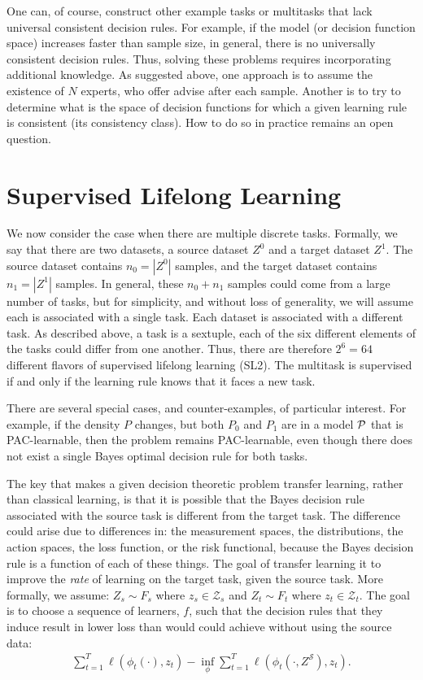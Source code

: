 \documentclass{article}
\begin{document}
One can, of course, construct other example tasks or multitasks that lack universal consistent decision rules.  For example, if the model (or decision function space) increases faster than sample size, in general, there is no universally consistent decision rules.  Thus, solving these problems requires incorporating additional knowledge.  As suggested above, one approach is to assume the existence of $N$ experts, who offer advise after each sample.  Another is to try to determine what is the space of decision functions for which a given learning rule is consistent (its consistency class).  How to do so in practice remains an open question.


\section{Supervised Lifelong Learning}
\label{sec:transfer}

We now consider the case when there are multiple discrete tasks.  Formally, we say that there are two datasets, a source dataset $Z^0$ and a target dataset $Z^1$. The source dataset contains $n_0 = | Z^0|$ samples, and the target dataset contains $n_1 = |Z^1|$ samples. In general, these $n_0+n_1$ samples could come from a large number of tasks, but for simplicity, and without loss of generality, we will assume each is associated with a single task.  Each dataset is associated with a different task.  As described above, a task is a sextuple, each of the six different elements of the tasks could differ from one another. Thus, there are therefore $2^6=64$ different flavors of supervised lifelong learning (SL2). The multitask is supervised if and only if the learning rule knows that it faces a new task.

There are several special cases, and counter-examples, of particular interest.  For example, if the density $P$ changes, but both $P_0$ and $P_1$ are in a model $\mathcal{P}$ that is PAC-learnable, then the problem remains PAC-learnable, even though there does not exist a single Bayes optimal decision rule for both tasks. 




The key that makes a given decision theoretic problem transfer learning, rather than classical learning, is that it is possible that the Bayes decision rule associated with the source task is different from the target task.  The difference could arise due to differences in: the measurement spaces, the distributions, the action spaces, the loss function, or the risk functional, because the Bayes decision rule is a function of each of these things.  The goal of transfer learning it to improve the \emph{rate} of learning on the target task, given the source task. More formally, we assume:
$Z_s \sim F_s$ where $z_s \in \mathcal{Z}_s$ and 
$Z_t \sim F_t$ where $z_t \in \mathcal{Z}_t$. 
The goal is to choose a sequence of learners, $f$, such that the decision rules that they induce result in lower loss than would could achieve without using the source data:
\begin{align}
    \sum_{t=1}^T \ell(\phi_t( \cdot), z_t)    - \inf_{\phi} \sum_{t=1}^T \ell(\phi_t( \cdot, Z^\mathcal{S}), z_t).
\end{align}
\end{document}
